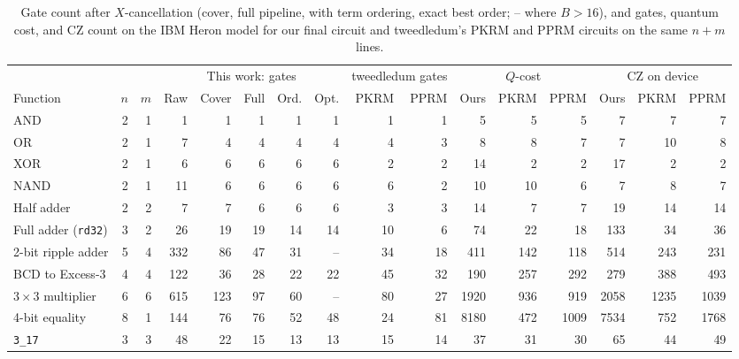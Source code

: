 \documentclass[conference]{IEEEtran}
\theoremstyle{plain}
\begin{document}
\begin{table}[t]
\centering
\caption{Gate count after $X$-cancellation (cover, full pipeline, with
term ordering, exact best order; -- where $B>16$), and gates, quantum
cost, and CZ count on the IBM Heron model for our final circuit and
tweedledum's PKRM and PPRM circuits on the same $n+m$ lines.}
\label{tab:results}
\footnotesize
\setlength{\tabcolsep}{4pt}
\begin{tabular}{@{}lrr rrrrr rr rrr rrr@{}}
\toprule
& & & \multicolumn{5}{c}{This work: gates} & \multicolumn{2}{c}{tweedledum gates} & \multicolumn{3}{c}{$Q$-cost} & \multicolumn{3}{c}{CZ on device}\\
\cmidrule(lr){4-8}\cmidrule(lr){9-10}\cmidrule(lr){11-13}\cmidrule(l){14-16}
Function & $n$ & $m$ & Raw & Cover & Full & Ord. & Opt. & PKRM & PPRM & Ours & PKRM & PPRM & Ours & PKRM & PPRM\\
\midrule
AND & 2 & 1 & 1 & 1 & 1 & 1 & 1 & 1 & 1 & 5 & 5 & 5 & 7 & 7 & 7\\
OR & 2 & 1 & 7 & 4 & 4 & 4 & 4 & 4 & 3 & 8 & 8 & 7 & 7 & 10 & 8\\
XOR & 2 & 1 & 6 & 6 & 6 & 6 & 6 & 2 & 2 & 14 & 2 & 2 & 17 & 2 & 2\\
NAND & 2 & 1 & 11 & 6 & 6 & 6 & 6 & 6 & 2 & 10 & 10 & 6 & 7 & 8 & 7\\
Half adder & 2 & 2 & 7 & 7 & 6 & 6 & 6 & 3 & 3 & 14 & 7 & 7 & 19 & 14 & 14\\
Full adder (\texttt{rd32}) & 3 & 2 & 26 & 19 & 19 & 14 & 14 & 10 & 6 & 74 & 22 & 18 & 133 & 34 & 36\\
2-bit ripple adder & 5 & 4 & 332 & 86 & 47 & 31 & -- & 34 & 18 & 411 & 142 & 118 & 514 & 243 & 231\\
BCD to Excess-3 & 4 & 4 & 122 & 36 & 28 & 22 & 22 & 45 & 32 & 190 & 257 & 292 & 279 & 388 & 493\\
$3{\times}3$ multiplier & 6 & 6 & 615 & 123 & 97 & 60 & -- & 80 & 27 & 1920 & 936 & 919 & 2058 & 1235 & 1039\\
4-bit equality & 8 & 1 & 144 & 76 & 76 & 52 & 48 & 24 & 81 & 8180 & 472 & 1009 & 7534 & 752 & 1768\\
\texttt{3\_17} & 3 & 3 & 48 & 22 & 15 & 13 & 13 & 15 & 14 & 37 & 31 & 30 & 65 & 44 & 49\\
\bottomrule
\end{tabular}
\end{table}
\end{document}
